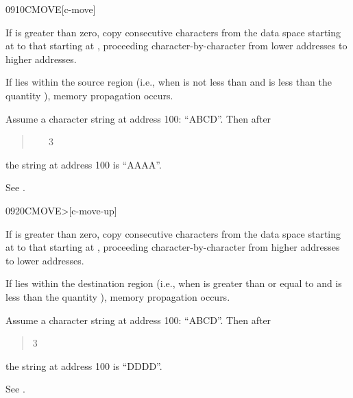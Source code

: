 \begin{worddef}{0910}{CMOVE}[c-move]
\item {}

	If  is greater than zero, copy  consecutive
	characters from the data space starting at  to
	that starting at , proceeding character-by-character
	from lower addresses to higher addresses.


	\begin{rationale} %
		If  lies within the source region (i.e., when
		 is not less than  and
		 is less than the quantity 
		 \word[core]{+}), memory propagation occurs.

		Assume a character string at address
		100: ``ABCD''. Then after

		\begin{quote}  ~  ~ 3 
		\end{quote}

		the string at address 100 is ``AAAA''.

		See .
	\end{rationale}
\end{worddef}


\begin{worddef}[CMOVEtop]{0920}{CMOVE>}[c-move-up]
\item {}

	If  is greater than zero, copy  consecutive
	characters from the data space starting at  to
	that starting at , proceeding character-by-character
	from higher addresses to lower addresses.


	\begin{rationale} %
		If  lies within the destination region (i.e.,
		when  is greater than or equal to
		 and  is less than the
		quantity  
		\word[core]{+}), memory propagation	occurs.

		Assume a character string at address
		100: ``ABCD''. Then after

		\begin{quote}   
			3 
		\end{quote}

		the string at address 100 is ``DDDD''.

		See .
	\end{rationale}
\end{worddef}


